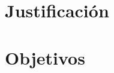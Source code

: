 \documentclass[spanish,openany]{report}
\date{\today}
\begin{document}

 \maketoc
%
%
%




	\section{Justificación}

	\section{Objetivos}
\end{document}
